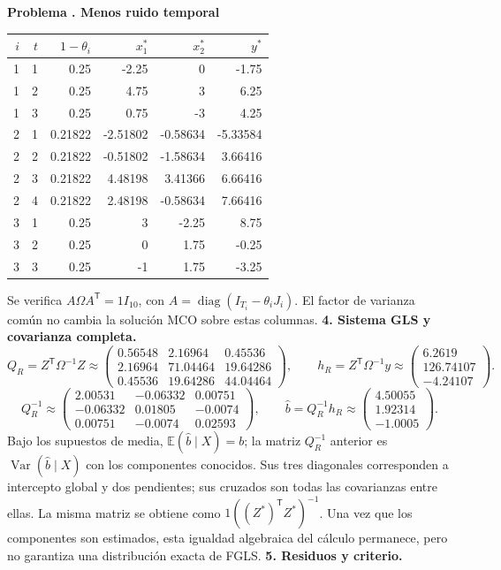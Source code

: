 \documentclass[11pt,a4paper]{article}
\newcommand{\E}{\mathbb E}
\newcommand{\T}{^{\mathsf T}}
\DeclareMathOperator{\Var}{Var}
\DeclareMathOperator{\diag}{diag}
\theoremstyle{definition}
\newcounter{problema}
\newenvironment{resuelto}[1]{\refstepcounter{problema}\par\medskip\Needspace{6\baselineskip}\textbf{Problema \theproblema. #1}\par}{\par\medskip}
\begin{document}
\begin{resuelto}{Menos ruido temporal}
\begin{center}\small
\begin{tabular}{rrrrrr}
\toprule
$i$&$t$&$1-\theta_i$&$x_1^*$&$x_2^*$&$y^*$\\
\midrule
1&1&0.25&-2.25&0&-1.75\\
1&2&0.25&4.75&3&6.25\\
1&3&0.25&0.75&-3&4.25\\
2&1&0.21822&-2.51802&-0.58634&-5.33584\\
2&2&0.21822&-0.51802&-1.58634&3.66416\\
2&3&0.21822&4.48198&3.41366&6.66416\\
2&4&0.21822&2.48198&-0.58634&7.66416\\
3&1&0.25&3&-2.25&8.75\\
3&2&0.25&0&1.75&-0.25\\
3&3&0.25&-1&1.75&-3.25\\
\bottomrule
\end{tabular}
\end{center}
Se verifica $A\Omega A\T=1I_{10}$, con $A=\diag(I_{T_i}-\theta_iJ_i)$. El factor de varianza común no cambia la solución MCO sobre estas columnas.
\textbf{4. Sistema GLS y covarianza completa.}
\[
Q_R=Z\T\Omega^{-1}Z\approx\begin{pmatrix}
0.56548&2.16964&0.45536\\2.16964&71.04464&19.64286\\0.45536&19.64286&44.04464
\end{pmatrix},\qquad h_R=Z\T\Omega^{-1}y\approx\begin{pmatrix}
6.2619\\126.74107\\-4.24107
\end{pmatrix}.
\]
\[
Q_R^{-1}\approx\begin{pmatrix}
2.00531&-0.06332&0.00751\\-0.06332&0.01805&-0.0074\\0.00751&-0.0074&0.02593
\end{pmatrix},\qquad \widehat b=Q_R^{-1}h_R\approx\begin{pmatrix}
4.50055\\1.92314\\-1.0005
\end{pmatrix}.
\]
Bajo los supuestos de media, $\E(\widehat b\mid X)=b$; la matriz $Q_R^{-1}$ anterior es $\Var(\widehat b\mid X)$ con los componentes conocidos. Sus tres diagonales corresponden a intercepto global y dos pendientes; sus cruzados son todas las covarianzas entre ellas.
La misma matriz se obtiene como $1((Z^*)\T Z^*)^{-1}$. Una vez que los componentes son estimados, esta igualdad algebraica del cálculo permanece, pero no garantiza una distribución exacta de FGLS.
\textbf{5. Residuos y criterio.}


\end{resuelto}
\end{document}
